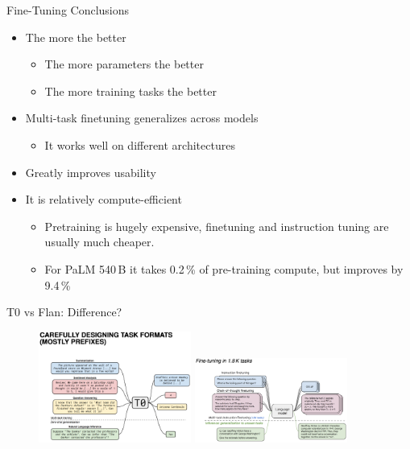 \begin{vbframe}{Fine-Tuning Conclusions}

\vfill

\begin{itemize}
\item The  more the better
    \begin{itemize}
    \item The more parameters the better
    \item The more training tasks the better
    \end{itemize}
\item Multi-task finetuning generalizes across models
    \begin{itemize}
    \item It works well on different architectures
    \end{itemize}
\item Greatly improves usability
\item It is relatively compute-efficient
    \begin{itemize}
    \item Pretraining is hugely expensive, finetuning and
    instruction tuning are usually much cheaper.
    \item For PaLM 540\,B it takes 0.2\,\% of pre-training compute, but improves by 9.4\,\%
    \end{itemize}
\end{itemize}

\vfill

\end{vbframe}



\begin{frame}{T0 vs Flan: Difference?}

\vfill
	
	\begin{figure}
		\includegraphics[width=5cm]{figure/t0comparison}
		\includegraphics[width=5cm]{figure/flancomparison}
	\end{figure}

\vfill

\end{frame}


